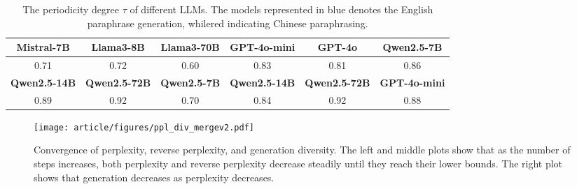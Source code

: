 \begin{table*}[t!]
    \centering
    \small
    \begin{tabular}{cccccc}
        \toprule
        \rowcolor{blue!20} \textbf{Mistral-7B} & \textbf{Llama3-8B} & \textbf{Llama3-70B} & \textbf{GPT-4o-mini} & \textbf{GPT-4o} & \textbf{Qwen2.5-7B} \\
        \midrule
        0.71 & 0.72 & 0.60 & 0.83 & 0.81 & 0.86 \\
        \midrule
        \cellcolor{blue!20} \textbf{Qwen2.5-14B} &\cellcolor{blue!20}  \textbf{Qwen2.5-72B} &  \cellcolor{red!20}  \textbf{Qwen2.5-7B} & \cellcolor{red!20}  \textbf{Qwen2.5-14B} &  \cellcolor{red!20} \textbf{Qwen2.5-72B} & \cellcolor{red!20} \textbf{ GPT-4o-mini} \\
        \midrule
        0.89 & 0.92 & 0.70 & 0.84 & 0.92 & 0.88 \\
        \bottomrule
    \end{tabular}
     \caption{The periodicity degree $\tau$ of different LLMs. The models represented in \colorbox{blue!20}{blue} denotes the English paraphrase generation, while\colorbox{red!20}{red} indicating Chinese paraphrasing.}
    \label{table:periodicity}
    \label{tab:model_comparison}
\end{table*}


\begin{figure*}[h]
    \centering
    \texttt{[image: article/figures/ppl\_div\_mergev2.pdf]}
    \caption{Convergence of perplexity, reverse perplexity, and generation diversity. The left and middle plots show that as the number of steps increases, both perplexity and reverse perplexity decrease steadily until they reach their lower bounds. The right plot shows that generation decreases as perplexity decreases.} 
    \label{figs:convergence}
\end{figure*}


